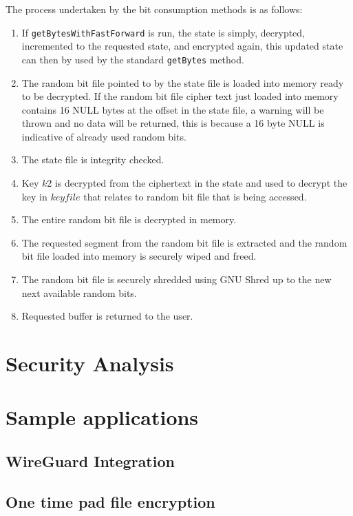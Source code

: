 \documentclass{paper}
\begin{document}
					The process undertaken by the bit consumption methods is as follows:
					\begin{enumerate}
						\setlength\itemsep{-0.3em}
						\item If \texttt{getBytesWithFastForward} is run, the state is simply, decrypted, incremented to the requested state, and encrypted again, this updated state can then by used by the standard \texttt{getBytes} method.
						\item The random bit file pointed to by the state file is loaded into memory ready to be decrypted. If the random bit file cipher text just loaded into memory contains 16 NULL bytes at the offset in the state file, a warning will be thrown and no data will be returned, this is because a 16 byte NULL is indicative of already used random bits.
						\item The state file is integrity checked.
						\item Key $\mathit{k2}$ is decrypted from the ciphertext in the state and used to decrypt the key in $\mathit{keyfile}$ that relates to random bit file that is being accessed.
						\item The entire random bit file is decrypted in memory.
						\item The requested segment from the random bit file is extracted and the random bit file loaded into memory is securely wiped and freed.
						\item The random bit file is securely shredded using GNU Shred up to the new next available random bits.
						\item Requested buffer is returned to the user.
					\end{enumerate}
					
				
		
		\section{Security Analysis}
		\section{Sample applications}
			\subsection{WireGuard Integration}
			\subsection{One time pad file encryption}
		
						
\end{document}
